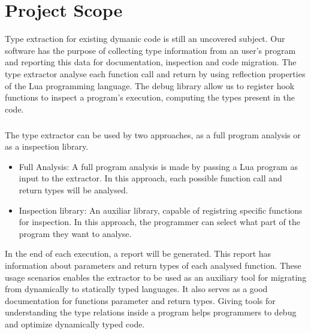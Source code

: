 
\chapter{Project Scope}
\label{cha:Project Scope}
Type extraction for existing dymanic code is still an uncovered subject. Our software has the purpose of collecting type information from an user's program and reporting this data for documentation, inspection and code migration. The type extractor analyse each function call and return by using reflection properties of the Lua programming language. The debug library allow us to register hook functions to inspect a program's execution, computing the types present in the code.
\paragraph*{}
The type extractor can be used by two approaches, as a full program analysis or as a inspection library.
\begin{itemize}
    \item{Full Analysis:} A full program analysis is made by passing a Lua program as input to the extractor. In this approach, each possible function call and return types will be analysed.
    \item{Inspection library:} An auxiliar library, capable of registring specific functions for inspection. In this approach, the programmer can select what part of the program they want to analyse.
\end{itemize}
In the end of each execution, a report will be generated. This report has information about parameters and return types of each analysed function. These usage scenarios enables the extractor to be used as an auxiliary tool for migrating from dynamically to statically typed languages. It also serves as a good documentation for functions parameter and return types. Giving tools for understanding the type relations inside a program helps programmers to debug and optimize dynamically typed code.



